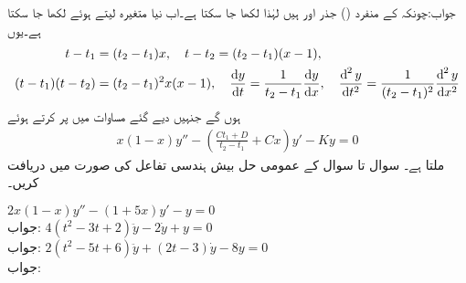 جواب:چونکہ  کے منفرد () جذر  اور  ہیں لہٰذا  لکھا جا سکتا ہے۔اب نیا متغیرہ  لیتے ہوئے  لکھا جا سکتا ہے۔یوں
\begin{align*}
t-t_1&=(t_2-t_1)x,\quad t-t_2=(t_2-t_1)(x-1),\\
(t-t_1)(t-t_2)&=(t_2-t_1)^2x(x-1),\quad \frac{\dif y}{\dif t}=\frac{1}{t_2-t_1}\frac{\dif y}{\dif x},\quad \frac{\dif^{\, 2} y}{\dif t^2}=\frac{1}{(t_2-t_1)^2}\frac{\dif^{\,2} y}{\dif x^2}
\end{align*}
ہوں گے جنہیں دیے گئے مساوات میں پر کرتے ہوئے
\begin{align}
x(1-x)y''-\left(\frac{Ct_1+D}{t_2-t_1}+Cx\right)y'-Ky=0
\end{align}
ملتا ہے۔
سوال  تا سوال  کے عمومی حل بیش ہندسی تفاعل کی صورت میں دریافت کریں۔

\quad
$2x(1-x)y''-(1+5x)y'-y=0$\\
جواب:
\quad
$4(t^2-3t+2)\ddot{y}-2\dot{y}+y=0$\\
جواب:
\quad
$2(t^2-5t+6)\ddot{y}+(2t-3)\dot{y}-8y=0$\\
جواب:

